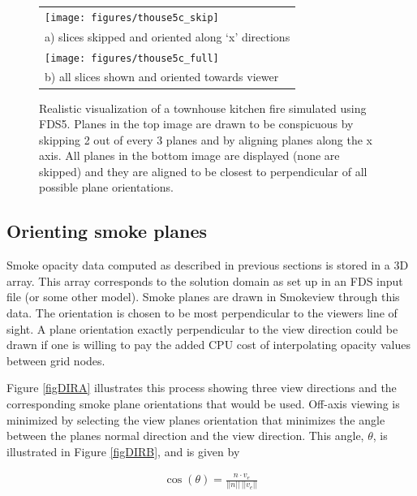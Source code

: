 \begin{figure}[\figoptions]
\begin{center}
\begin{tabular}{l}
\texttt{[image: figures/thouse5c\_skip]}\\
a) slices skipped and oriented along `x' directions\\
\texttt{[image: figures/thouse5c\_full]}\\
b) all slices shown and oriented towards viewer \\
\end{tabular}
\end{center}
\caption{Realistic visualization of a townhouse kitchen fire simulated
using FDS5. Planes in the top image are drawn to be conspicuous by
skipping 2 out of every 3 planes and by aligning planes along the
x axis. All planes in the bottom image are displayed (none are
skipped) and they are aligned to be closest to perpendicular of
all possible plane orientations.
  }
\label{figsmoke3d}%
\end{figure}

%
%

\subsection{Orienting smoke planes}

Smoke opacity data computed as described in previous sections is stored in a 3D array. This array corresponds to the solution domain as set up in an FDS input file (or some other model). Smoke
planes are drawn in Smokeview through this data.  The orientation is chosen to be most perpendicular to the viewers line of sight. A plane orientation exactly perpendicular to the view direction
could be drawn if one is willing to pay the added CPU cost of interpolating opacity values between grid nodes.

Figure \ref{figDIRA} illustrates this process showing three view directions and the corresponding smoke plane orientations that would be used. Off-axis viewing is minimized by selecting the view
planes orientation that minimizes the angle between the planes normal direction and the view direction. This angle, $\theta$, is illustrated in Figure \ref{figDIRB}, and is given by

\begin{eqnarray*}
\cos(\theta)=\frac{n\cdot v_e}{||n||~||v_e||}
\end{eqnarray*}

